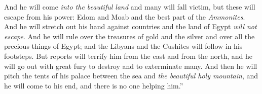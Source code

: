 \begin{biblechapter}
\verse And he will come \textit{into the beautiful land} and many will fall victim, but these will escape from his power: Edom and Moab and the best part of the \textit{Ammonites}.
\verse And he will stretch out his hand against countries and the land of Egypt \textit{will not escape}.
\verse And he will rule over the treasures of gold and the silver and over all the precious things of Egypt; and the Libyans and the Cushites will follow in his footsteps.
\verse But reports will terrify him from the east and from the north, and he will go out with great fury to destroy and to exterminate many.
\verse And then he will pitch the tents of his palace between the sea and \textit{the beautiful holy mountain}, and he will come to his end, and there is no one helping him.”
\end{biblechapter}

